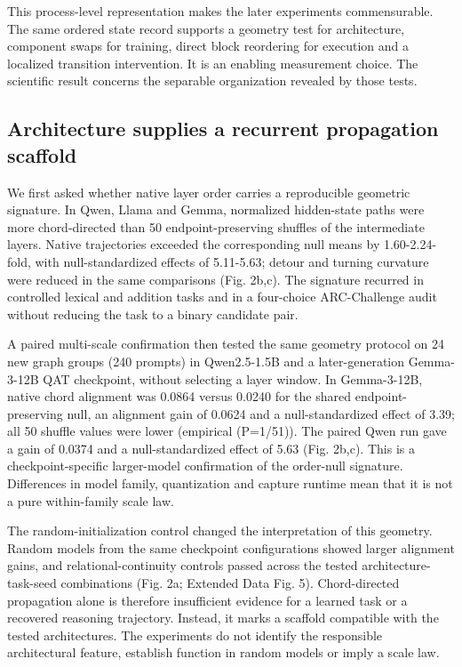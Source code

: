 \documentclass[12pt]{article}
\begin{document}
This process-level representation makes the later experiments commensurable. The same ordered state record supports a geometry test for architecture, component swaps for training, direct block reordering for execution and a localized transition intervention. It is an enabling measurement choice. The scientific result concerns the separable organization revealed by those tests.

\subsection*{Architecture supplies a recurrent propagation scaffold}

We first asked whether native layer order carries a reproducible geometric signature. In Qwen, Llama and Gemma, normalized hidden-state paths were more chord-directed than 50 endpoint-preserving shuffles of the intermediate layers. Native trajectories exceeded the corresponding null means by 1.60-2.24-fold, with null-standardized effects of 5.11-5.63; detour and turning curvature were reduced in the same comparisons (Fig. 2b,c). The signature recurred in controlled lexical and addition tasks and in a four-choice ARC-Challenge audit without reducing the task to a binary candidate pair.

A paired multi-scale confirmation then tested the same geometry protocol on 24 new graph groups (240 prompts) in Qwen2.5-1.5B and a later-generation Gemma-3-12B QAT checkpoint, without selecting a layer window. In Gemma-3-12B, native chord alignment was 0.0864 versus 0.0240 for the shared endpoint-preserving null, an alignment gain of 0.0624 and a null-standardized effect of 3.39; all 50 shuffle values were lower (empirical (P=1/51)). The paired Qwen run gave a gain of 0.0374 and a null-standardized effect of 5.63 (Fig. 2b,c). This is a checkpoint-specific larger-model confirmation of the order-null signature. Differences in model family, quantization and capture runtime mean that it is not a pure within-family scale law.

The random-initialization control changed the interpretation of this geometry. Random models from the same checkpoint configurations showed larger alignment gains, and relational-continuity controls passed across the tested architecture-task-seed combinations (Fig. 2a; Extended Data Fig. 5). Chord-directed propagation alone is therefore insufficient evidence for a learned task or a recovered reasoning trajectory. Instead, it marks a scaffold compatible with the tested architectures. The experiments do not identify the responsible architectural feature, establish function in random models or imply a scale law.
\end{document}
